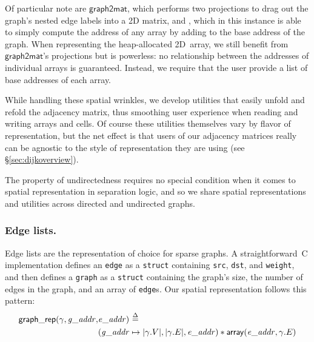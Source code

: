 Of particular note are $\mathsf{graph2mat}$, which performs two projections to
drag out the graph's nested edge labels into a 2D matrix, and 
, which in this instance is able to simply compute
the address of any array  by adding to the base address of the graph.
When representing the heap-allocated 2D~array, we still benefit from 
$\mathsf{graph2mat}$'s projections but  is powerless: no relationship
between the addresses of individual arrays is guaranteed.
Instead, we require that the user provide a list of base addresses
of each array. 

While handling these spatial wrinkles, we develop utilities that easily 
unfold and refold the adjacency matrix, thus smoothing user 
experience when reading and writing arrays and cells. Of course
these utilities themselves vary by flavor of representation, but 
the net effect is that users of our adjacency matrices really can 
be agnostic to the style of representation they are using 
(see \S\ref{sec:dijkoverview}).

The property of undirectedness requires no special condition 
when it comes to spatial representation in separation logic, 
and so we share spatial representations and utilities 
across directed and undirected graphs.


\subsubsection{Edge lists.}

Edge lists are the representation of choice 
for sparse graphs. A straightforward~C implementation 
defines an \texttt{edge} as a 
\texttt{struct} containing \texttt{src}, \texttt{dst}, and 
\texttt{weight}, and then defines a \texttt{graph} as a 
\texttt{struct} containing 
the graph's size, the number of edges in the graph, 
and an array of \texttt{edge}s. Our spatial representation 
follows this pattern:
\vspace{-0.5em}
\begin{equation*}
\begin{split}
\mathsf{graph\_rep}(\gamma, \mathit{g\_addr}, &\mathit{e\_addr})~\mathbin{\stackrel{\Delta}{=}}~ \\
&(\mathit{g\_addr} \mapsto \lvert\gamma.V\rvert, \lvert\gamma.E\rvert, \mathit{e\_addr})
\ast
\mathsf{array}(\mathit{e\_addr},\gamma.E)
\end{split}
\end{equation*}

